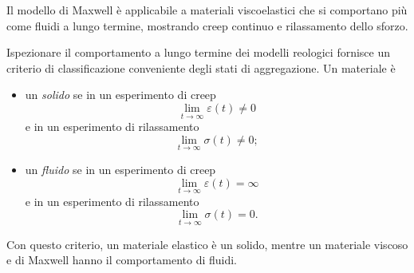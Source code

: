 Il modello di Maxwell è applicabile a materiali viscoelastici che si comportano più come fluidi a lungo termine, mostrando creep continuo e rilassamento dello sforzo.
%
%
%

\begin{remark}
Ispezionare il comportamento a lungo termine dei modelli reologici fornisce un criterio di classificazione conveniente degli stati di aggregazione. Un materiale è
\begin{itemize}
	\item un \textit{solido} se in un esperimento di creep
	\begin{equation}
		\lim_{t\to\infty}\varepsilon(t)\neq 0
	\end{equation}
e in un esperimento di rilassamento
\begin{equation}
\lim_{t\to\infty}\sigma(t)\neq 0;
\end{equation}
\item un \textit{fluido} se in un esperimento di creep
\begin{equation}
	\lim_{t\to\infty}\varepsilon(t)=\infty
\end{equation}
e in un esperimento di rilassamento
\begin{equation}
	\lim_{t\to\infty}\sigma(t)= 0.
\end{equation}
\end{itemize}
Con questo criterio, un materiale elastico è un solido, mentre un materiale viscoso e di Maxwell hanno il comportamento di fluidi.
\end{remark}

